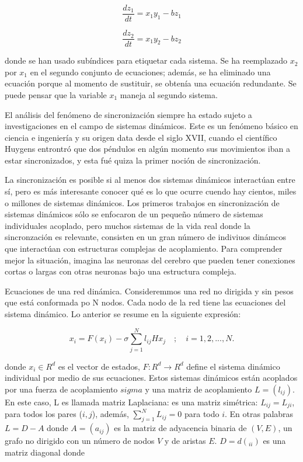 \documentclass{llncs}
\theoremstyle{plane}
\begin{document}
\begin{equation}
\frac{d z_{1}}{dt}=  x_{1}y_{1} - b z_{1}
\end{equation}


\begin{equation}
\frac{d z_{2}}{dt}=  x_{1}y_{2} - b z_{2}
\end{equation}

donde se han usado subíndices para etiquetar cada sistema. Se ha reemplazado $x_{2}$ por $x_{1}$ en el segundo conjunto de ecuaciones; además, se ha eliminado una ecuación porque al momento de sustituir, se obtenía una ecuación redundante. Se puede pensar que la variable $x_{1}$ maneja al segundo sistema. 



El análisis del fenómeno de sincronización siempre ha estado sujeto a investigaciones en el campo de sistemas dinámicos. Este es un fenómeno básico en ciencia e ingeniería y su origen data desde el siglo XVII, cuando el científico Huygens entrontró que dos péndulos en algún momento sus movimientos iban a estar sincronizados, y esta fué quiza la primer noción de sincronización.

La sincronización es posible si al menos dos sistemas dinámicos interactúan entre sí, pero es más interesante conocer qué es lo que ocurre cuendo hay cientos, miles o millones de sistemas dinámicos.  Los primeros trabajos en sincronización de sistemas dinámicos sólo se enfocaron de un pequeño número de sistemas individuales acoplado, pero muchos sistemas de la vida real donde la sincronzación es relevante, consisten en un gran número de indiviuos dinámcos que interactúan con estructuras complejas de acoplamiento. Para comprender mejor la situación, imagina las neuronas del cerebro que pueden tener conexiones cortas o largas con otras neuronas bajo una estructura compleja. 

Ecuaciones de una red dinámica.
Consideremmos una red no dirigida y sin pesos que está conformada po N nodos. Cada nodo de la red tiene las ecuaciones del sistema dinámico. Lo anterior se resume en la siguiente expresión:

\begin{equation}
x_{i}= F(x_{i})  - \sigma \sum_{j=1}^{N}l_{ij}Hx_{j} \quad ; \quad i = 1,2,...,N.
\end{equation}

donde $x_{i} \in R^{d}$ es el vector de estados, $F:R^{d} \longrightarrow R^{d} $ define el sistema dinámico individual por medio de sus ecuaciones. Estos sistemas dinámicos están acoplados por una fuerza de acoplamiento $sigma$ y una matriz de acoplamiento $L = (l_{ij})$. En este caso, L es llamada matriz Laplaciana: es una matriz simétrica: $L_{ij}= L_{ji}$, para todos los pares ($i, j$), además, $\sum_{j=1}^{N} L_{ij}=0$ para todo $i$. En otras palabras $L = D-A$ donde $A= (a_{ij})$ es la matriz de adyacencia binaria de $(V, E)$, un grafo no dirigido con un número de nodos $V$ y de aristas $E$. $D= d(_{ii})$ es una matriz diagonal donde 
\end{document}
